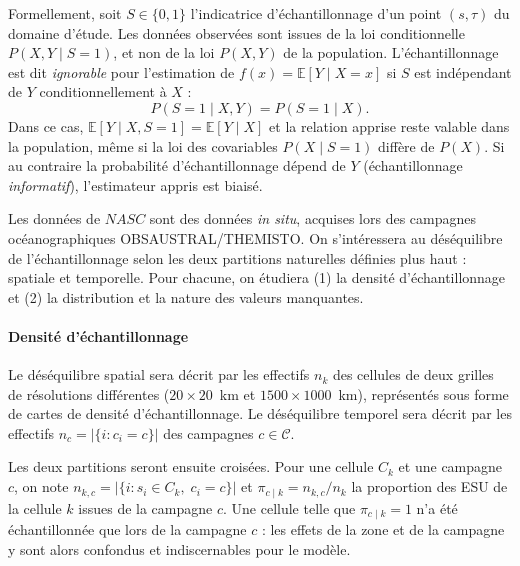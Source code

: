 		Formellement, soit $S \in \{0, 1\}$ l'indicatrice d'échantillonnage d'un point $(s, \tau)$ du domaine d'étude. Les données observées sont issues de la loi conditionnelle $P(X, Y \mid S = 1)$, et non de la loi $P(X, Y)$ de la population. L'échantillonnage est dit \textit{ignorable} pour l'estimation de $f(x) = \mathbb{E}[Y \mid X = x]$ si $S$ est indépendant de $Y$ conditionnellement à $X$ :
		\begin{equation}\label{eq:ignorable}
			P(S = 1 \mid X, Y) = P(S = 1 \mid X).
		\end{equation}
		Dans ce cas, $\mathbb{E}[Y \mid X, S = 1] = \mathbb{E}[Y \mid X]$ et la relation apprise reste valable dans la population, même si la loi des covariables $P(X \mid S = 1)$ diffère de $P(X)$. Si au contraire la probabilité d'échantillonnage dépend de $Y$ (échantillonnage \textit{informatif}), l'estimateur appris est biaisé.
		
		Les données de $NASC$ sont des données \textit{in situ}, acquises lors des campagnes océanographiques OBSAUSTRAL/THEMISTO. %
		On s'intéressera au déséquilibre de l'échantillonnage selon les deux partitions naturelles définies plus haut : spatiale et temporelle. Pour chacune, on étudiera (1) la densité d'échantillonnage et (2) la distribution et la nature des valeurs manquantes.
		
		\paragraph{Densité d'échantillonnage}
			Le déséquilibre spatial sera décrit par les effectifs $n_k$ des cellules de deux grilles de résolutions différentes ($20 \times 20$~km et $1500 \times 1000$~km), représentés sous forme de cartes de densité d'échantillonnage. Le déséquilibre temporel sera décrit par les effectifs $n_c = |\{i : c_i = c\}|$ des campagnes $c \in \mathcal{C}$.
			
			Les deux partitions seront ensuite croisées. Pour une cellule $C_k$ et une campagne $c$, on note $n_{k,c} = |\{i : s_i \in C_k,\; c_i = c\}|$ et $\pi_{c \mid k} = n_{k,c} / n_k$ la proportion des ESU de la cellule $k$ issues de la campagne $c$. Une cellule telle que $\pi_{c \mid k} = 1$ n'a été échantillonnée que lors de la campagne $c$ : les effets de la zone et de la campagne y sont alors confondus et indiscernables pour le modèle.
			

